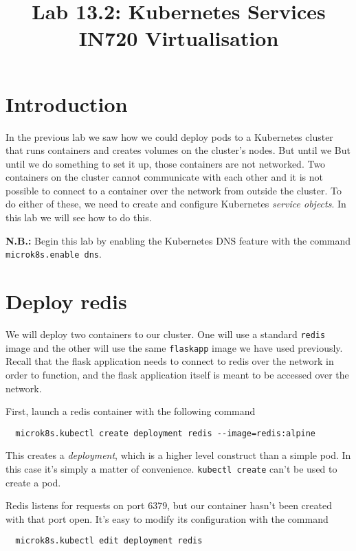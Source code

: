 \documentclass{article}
\begin{document}
\title{Lab 13.2: Kubernetes Services \\IN720 Virtualisation}
\date{}
\maketitle

\section*{Introduction}
In the previous lab we saw how we could deploy pods to a Kubernetes cluster that runs containers and creates volumes on the cluster's nodes. But until 
we But until we do something to set it up, those containers are not networked. Two containers on the cluster cannot communicate with each other and it is not possible to connect to a container over the network from outside the cluster. To do either of these, we need to create and configure Kubernetes \emph{service objects}. In this lab we will see how to do this.


\textbf{N.B.:} Begin this lab by enabling the Kubernetes DNS feature with the command \texttt{microk8s.enable dns}.

\section{Deploy redis}
We will deploy two containers to our cluster. One will use a standard \texttt{redis} image and the other will use the same \texttt{flaskapp} image we have used previously. Recall that the flask application needs to connect to redis over the network in order to function, and the flask application itself is meant to be accessed over the network.

First, launch a redis container with the following command

\begin{verbatim}
  microk8s.kubectl create deployment redis --image=redis:alpine
\end{verbatim}

This creates a \emph{deployment}, which is a higher level construct than a simple pod. In this case it's simply a matter of convenience. \texttt{kubectl create} can't be used to create a pod.

Redis listens for requests on port 6379, but our container hasn't been created with that port open. It's easy to modify its configuration with the command
  
\begin{verbatim}
  microk8s.kubectl edit deployment redis
\end{verbatim}
\end{document}
